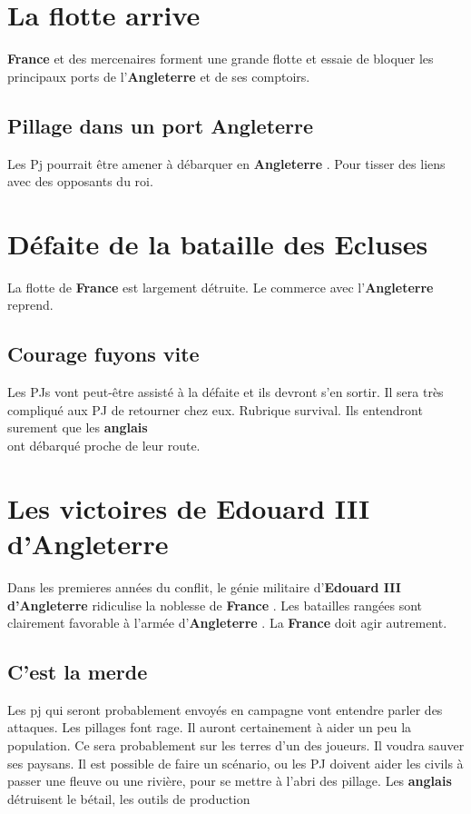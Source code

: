 \documentclass[oneside,12pt]{book}
\newcommand{\France}{\textbf{France} }
\newcommand{\Angleterre}{\textbf{Angleterre} }
\newcommand{\EdouardIII}{\textbf{Edouard III d'Angleterre} }%
\newcommand{\Anglais}{\textbf{anglais\\} }
\begin{document}
\begin{flushleft}
\section{La flotte arrive}
\France et des mercenaires forment une grande flotte et essaie de bloquer les principaux ports de l'\Angleterre et de ses comptoirs. 

\subsection{Pillage dans un port \Angleterre}
Les Pj pourrait être amener à débarquer en \Angleterre. Pour tisser des liens avec des opposants du roi. 

\section{Défaite de la bataille des Ecluses}
La flotte de \France est largement détruite. Le commerce avec l'\Angleterre reprend. 

\subsection{Courage fuyons vite}
Les PJs vont peut-être assisté à la défaite et ils devront s'en sortir. Il sera très compliqué aux PJ de retourner chez eux. 
Rubrique survival. Ils entendront surement que les \Anglais ont débarqué proche de leur route. 

\section{Les victoires de \EdouardIII}
Dans les premieres années du conflit, le génie militaire d'\EdouardIII ridiculise la noblesse de \France. Les batailles rangées 
sont clairement favorable à l'armée d'\Angleterre. La \France doit agir autrement. 

\subsection{C'est la merde}
Les pj qui seront probablement envoyés en campagne vont entendre parler des attaques. 
Les pillages font rage. Il auront certainement à aider un peu la population. 
Ce sera probablement sur les terres d'un des joueurs. Il voudra sauver ses paysans.
Il est possible de faire un scénario, ou les PJ doivent aider les civils à passer une fleuve ou une rivière, pour se mettre à 
l'abri des pillage. Les \Anglais détruisent le bétail, les outils de production 


\end{flushleft}
\end{document}
